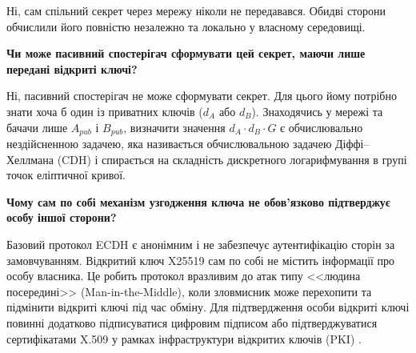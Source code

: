 Ні, сам спільний секрет через мережу ніколи не передавався. Обидві сторони обчислили його повністю незалежно та локально у власному середовищі.

\textbf{Чи може пасивний спостерігач сформувати цей секрет, маючи лише передані відкриті ключі?}

Ні, пасивний спостерігач не може сформувати секрет. Для цього йому потрібно знати хоча б один із приватних ключів ($d_A$ або $d_B$). Знаходячись у мережі та бачачи лише $A_{pub}$ і $B_{pub}$, визначити значення $d_A \cdot d_B \cdot G$ є обчислювально нездійсненною задачею, яка називається обчислювальною задачею Діффі--Хеллмана (CDH) і спирається на складність дискретного логарифмування в групі точок еліптичної кривої.

\textbf{Чому сам по собі механізм узгодження ключа не обов'язково підтверджує особу іншої сторони?}

Базовий протокол ECDH є анонімним і не забезпечує аутентифікацію сторін за замовчуванням. Відкритий ключ X25519 сам по собі не містить інформації про особу власника. Це робить протокол вразливим до атак типу <<людина посередині>> (Man-in-the-Middle), коли зловмисник може перехопити та підмінити відкриті ключі під час обміну. Для підтвердження особи відкриті ключі повинні додатково підписуватися цифровим підписом або підтверджуватися сертифікатами X.509 у рамках інфраструктури відкритих ключів (PKI) \cite{RFC7748,NIST80057}.
